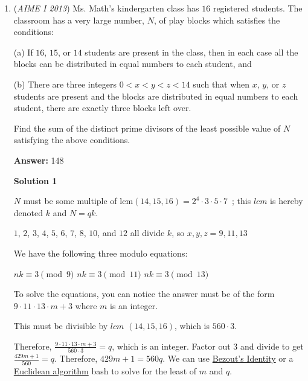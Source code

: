 \begin{enumerate}
 \textbf{Remark:} The complex conjugate theorem states that a polynomial with real coefficients must have an even amount of complex roots.One of them is the complex number $a + bi$, and the other is it's conjugate, or $a - bi$. These, when multiplied cancel out and become real numbers ($a^2 + b^2$). Similar logic for addition. 

 


	\item (\textit{AIME I 2013}) Ms. Math's kindergarten class has $16$ registered students. The classroom has a very large number, $N$, of play blocks which satisfies the conditions:


 (a) If $16$, $15$, or $14$ students are present in the class, then in each case all the blocks can be distributed in equal numbers to each student, and


 (b) There are three integers $0 < x < y < z < 14$ such that when $x$, $y$, or $z$ students are present and the blocks are distributed in equal numbers to each student, there are exactly three blocks left over.


 Find the sum of the distinct prime divisors of the least possible value of $N$ satisfying the above conditions.


 
 \textbf{Answer: }148



\textbf{Solution 1}

$N$ must be some multiple of $\text{lcm}(14, 15, 16)= 2^{4}\cdot 3\cdot 5\cdot 7$ ; this $lcm$ is hereby denoted $k$ and $N = qk$.

 $1$, $2$, $3$, $4$, $5$, $6$, $7$, $8$, $10$, and $12$ all divide $k$, so $x, y, z = 9, 11, 13$

 We have the following three modulo equations:

 $nk\equiv 3\pmod{9}$
$nk\equiv 3\pmod{11}$
$nk\equiv 3\pmod{13}$

 To solve the equations, you can notice the answer must be of the form $9\cdot 11\cdot 13\cdot m + 3$ where $m$ is an integer. 

 This must be divisible by $lcm$ $(14, 15, 16)$, which is $560\cdot 3$. 

 Therefore, $\frac{9\cdot 11\cdot 13\cdot m + 3}{560\cdot 3} = q$, which is an integer. Factor out $3$ and divide to get $\frac{429m+1}{560} = q$. Therefore, $429m+1=560q$. We can use \href{https://artofproblemsolving.com/wiki/index.php?title=Bezout\%27s\_Lemma}{Bezout's Identity} or a \href{https://artofproblemsolving.com/wiki/index.php?title=Euclidean\_algorithm}{Euclidean algorithm} bash to solve for the least of $m$ and $q$. 


\end{enumerate}
